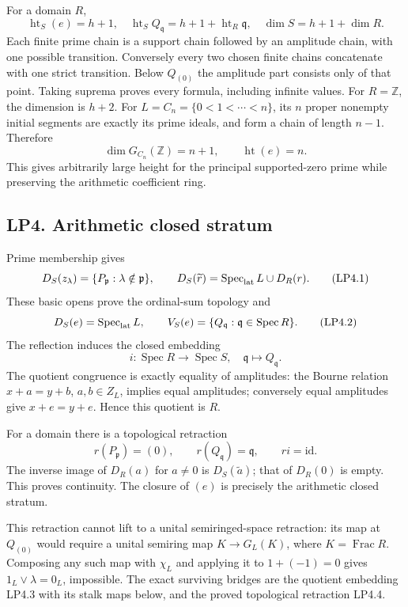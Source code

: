 For a domain \(R\), \[
\operatorname{ht}_S(e)=h+1,\quad
\operatorname{ht}_S Q_{\mathfrak q}=h+1+\operatorname{ht}_R\mathfrak q,\quad
\dim S=h+1+\dim R.
\tag{LP3.3}
\] Each finite prime chain is a support chain followed by an amplitude
chain, with one possible transition. Conversely every two chosen finite
chains concatenate with one strict transition. Below \(Q_{(0)}\) the
amplitude part consists only of that point. Taking suprema proves every
formula, including infinite values. For \(R=\mathbb Z\), the dimension
is \(h+2\). For \(L=C_n=\{0<1<\cdots<n\}\), its \(n\) proper nonempty
initial segments are exactly its prime ideals, and form a chain of
length \(n-1\). Therefore \[
\dim G_{C_n}(\mathbb Z)=n+1,\qquad \operatorname{ht}(e)=n.
\tag{LP3.4}
\] This gives arbitrarily large height for the principal supported-zero
prime while preserving the arithmetic coefficient ring.

\subsection{LP4. Arithmetic closed
stratum}\label{lp4.-arithmetic-closed-stratum}

Prime membership gives \[
D_S(z_\lambda)=\{P_{\mathfrak p}:\lambda\notin\mathfrak p\},\qquad
D_S(\widetilde r)=\operatorname{Spec}_{\rm lat}L\cup D_R(r).
\tag{LP4.1}
\] These basic opens prove the ordinal-sum topology and \[
D_S(e)=\operatorname{Spec}_{\rm lat}L,\qquad
V_S(e)=\{Q_{\mathfrak q}:\mathfrak q\in\operatorname{Spec}R\}.
\tag{LP4.2}
\] The reflection induces the closed embedding \[
i:\operatorname{Spec}R\to\operatorname{Spec}S,\quad
\mathfrak q\mapsto Q_{\mathfrak q}.
\tag{LP4.3}
\] The quotient congruence is exactly equality of amplitudes: the Bourne
relation \(x+a=y+b\), \(a,b\in Z_L\), implies equal amplitudes;
conversely equal amplitudes give \(x+e=y+e\). Hence this quotient is
\(R\).

For a domain there is a topological retraction \[
r(P_{\mathfrak p})=(0),\qquad r(Q_{\mathfrak q})=\mathfrak q,\qquad ri=\mathrm{id}.
\tag{LP4.4}
\] The inverse image of \(D_R(a)\) for \(a\ne0\) is
\(D_S(\widetilde a)\); that of \(D_R(0)\) is empty. This proves
continuity. The closure of \((e)\) is precisely the arithmetic closed
stratum.

This retraction cannot lift to a unital semiringed-space retraction: its
map at \(Q_{(0)}\) would require a unital semiring map \(K\to G_L(K)\),
where \(K=\operatorname{Frac}R\). Composing any such map with \(\chi_L\)
and applying it to \(1+(-1)=0\) gives \(1_L\vee\lambda=0_L\),
impossible. The exact surviving bridges are the quotient embedding LP4.3
with its stalk maps below, and the proved topological retraction LP4.4.

